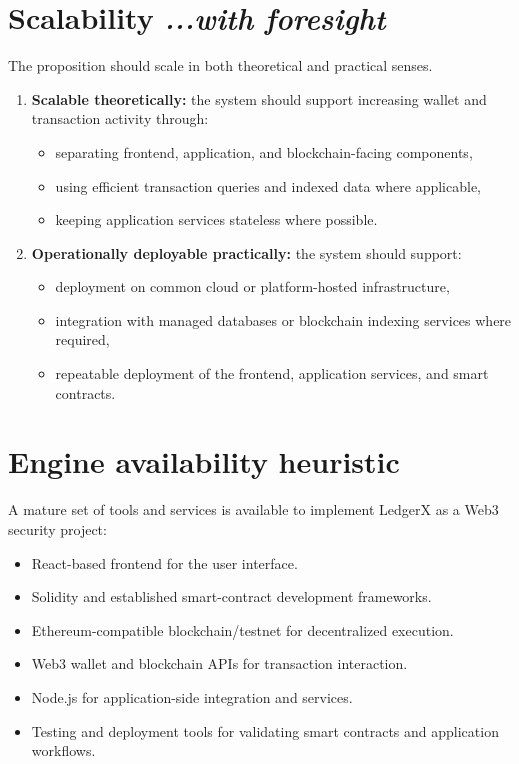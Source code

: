 \documentclass[10pt,a4paper]{article}
\begin{document}
\section{Scalability \hfill \normalfont\itshape ...with foresight}

The proposition should scale in both theoretical and practical senses.

\begin{enumerate}
    \item \textbf{Scalable theoretically:} the system should support increasing wallet and transaction activity through:
    \begin{itemize}
        \item separating frontend, application, and blockchain-facing components,
        \item using efficient transaction queries and indexed data where applicable,
        \item keeping application services stateless where possible.
    \end{itemize}

    \item \textbf{Operationally deployable practically:} the system should support:
    \begin{itemize}
        \item deployment on common cloud or platform-hosted infrastructure,
        \item integration with managed databases or blockchain indexing services where required,
        \item repeatable deployment of the frontend, application services, and smart contracts.
    \end{itemize}
\end{enumerate}

\section{Engine availability heuristic}

A mature set of tools and services is available to implement LedgerX as a Web3 security project:

\begin{itemize}
    \item React-based frontend for the user interface.
    \item Solidity and established smart-contract development frameworks.
    \item Ethereum-compatible blockchain/testnet for decentralized execution.
    \item Web3 wallet and blockchain APIs for transaction interaction.
    \item Node.js for application-side integration and services.
    \item Testing and deployment tools for validating smart contracts and application workflows.
\end{itemize}
\end{document}
